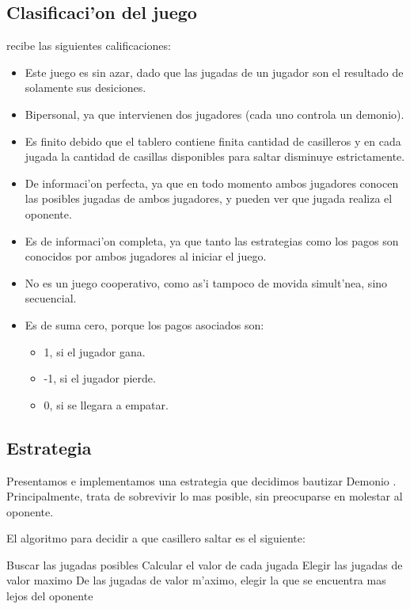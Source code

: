 \subsection{Clasificaci'on del juego}
 recibe las siguientes calificaciones:
\begin{itemize}
\item Este juego es sin azar, dado que las jugadas de un jugador son el resultado de solamente sus desiciones.
\item Bipersonal, ya que intervienen dos jugadores (cada uno controla un demonio).
\item Es finito debido que el tablero contiene finita cantidad de casilleros y en cada jugada la cantidad de casillas disponibles para saltar disminuye estrictamente.
\item De informaci'on perfecta, ya que en todo momento ambos jugadores conocen las posibles jugadas de ambos jugadores, y pueden ver que jugada realiza el oponente.
\item Es de informaci'on completa, ya que tanto las estrategias como los pagos son conocidos por ambos jugadores al iniciar el juego.
\item No es un juego cooperativo, como as'i tampoco de movida simult'nea, sino secuencial.
\item Es de suma cero, porque los pagos asociados son:
	\begin{itemize}
	\item 1, si el jugador gana.
	\item -1, si el jugador pierde.
	\item 0, si se llegara a empatar.
	\end{itemize}
\end{itemize}


\subsection{Estrategia}
Presentamos e implementamos una estrategia que decidimos bautizar Demonio . Principalmente, trata de sobrevivir lo mas posible, sin preocuparse en molestar al oponente. 

El algoritmo para decidir a que casillero saltar es el siguiente:


\begin{algorithmic}[1]
\STATE Buscar las jugadas posibles
\STATE Calcular el valor de cada jugada
\STATE Elegir las jugadas de valor maximo
\RETURN De las jugadas de valor m'aximo, elegir la que se encuentra mas lejos del oponente
\end{algorithmic}



